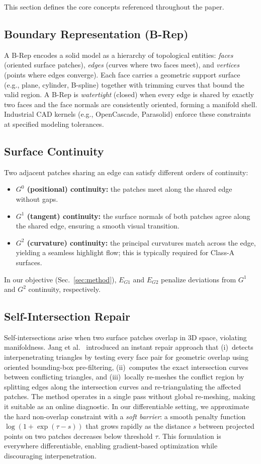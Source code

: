 \documentclass{ieeeaccess}
\begin{document}
This section defines the core concepts referenced throughout the paper.

\subsection{Boundary Representation (B-Rep)}
A B-Rep encodes a solid model as a hierarchy of topological entities:
\emph{faces} (oriented surface patches), \emph{edges} (curves where two faces meet),
and \emph{vertices} (points where edges converge).
Each face carries a geometric support surface (e.g., plane, cylinder, B-spline)
together with trimming curves that bound the valid region.
A B-Rep is \emph{watertight} (closed) when every edge is shared by exactly two faces
and the face normals are consistently oriented, forming a manifold shell.
Industrial CAD kernels (e.g., OpenCascade, Parasolid) enforce these
constraints at specified modeling tolerances.

\subsection{Surface Continuity}
Two adjacent patches sharing an edge can satisfy different orders of continuity:
\begin{itemize}
  \item \textbf{$G^0$ (positional) continuity:} the patches meet along the shared edge without gaps.
  \item \textbf{$G^1$ (tangent) continuity:} the surface normals of both patches agree along the shared edge, ensuring a smooth visual transition.
  \item \textbf{$G^2$ (curvature) continuity:} the principal curvatures match across the edge, yielding a seamless highlight flow; this is typically required for Class-A surfaces.
\end{itemize}
In our objective (Sec.~\ref{sec:method}), $E_{G1}$ and $E_{G2}$ penalize deviations from $G^1$ and $G^2$ continuity, respectively.

\subsection{Self-Intersection Repair}
Self-intersections arise when two surface patches overlap in 3D space, violating manifoldness.
Jang et al.~\cite{b12} introduced an instant repair approach that
(i)~detects interpenetrating triangles by testing every face pair for
geometric overlap using oriented bounding-box pre-filtering,
(ii)~computes the exact intersection curves between conflicting
triangles, and (iii)~locally re-meshes the conflict region by splitting
edges along the intersection curves and re-triangulating the affected
patches. The method operates in a single pass without global re-meshing,
making it suitable as an online diagnostic.
In our differentiable setting, we approximate the hard non-overlap constraint with a
\emph{soft barrier}: a smooth penalty function
$\log(1+\exp(\tau-s))$ that grows rapidly as the distance $s$ between projected
points on two patches decreases below threshold $\tau$.
This formulation is everywhere differentiable, enabling gradient-based
optimization while discouraging interpenetration.
\end{document}
